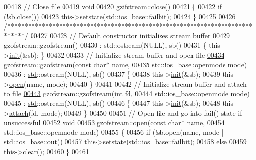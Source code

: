 \begin{DoxyCode}
{00418 \textcolor{comment}{// Close file}
00419 \textcolor{keywordtype}{void}
\hyperlink{classgzifstream_a073fadd9dc90195c47a6ae2d863c8ace}{00420} \hyperlink{classgzifstream_a073fadd9dc90195c47a6ae2d863c8ace}{gzifstream::close}()
00421 \{
00422   \textcolor{keywordflow}{if} (!sb.close())
00423     this->setstate(std::ios\_base::failbit);
00424 \}
00425 
00426 \textcolor{comment}{/*****************************************************************************/}
00427 
00428 \textcolor{comment}{// Default constructor initializes stream buffer}
00429 gzofstream::gzofstream()
00430 : std::ostream(NULL), sb()
00431 \{ this->\hyperlink{structinit}{init}(&sb); \}
00432 
00433 \textcolor{comment}{// Initialize stream buffer and open file}
\hyperlink{classgzofstream_a4334d31aab99f8c9c2277b672a55c78f}{00434} gzofstream::gzofstream(\textcolor{keyword}{const} \textcolor{keywordtype}{char}* name,
00435                        std::ios\_base::openmode mode)
00436 : \hyperlink{namespacestd}{std}::ostream(NULL), sb()
00437 \{
00438   this->\hyperlink{structinit}{init}(&sb);
00439   this->\hyperlink{classgzofstream_aee3eb31f07eda7f5ad1f60d59ea4b239}{open}(name, mode);
00440 \}
00441 
00442 \textcolor{comment}{// Initialize stream buffer and attach to file}
\hyperlink{classgzofstream_aa94d0c8414119a52f2a7f42aa0440941}{00443} gzofstream::gzofstream(\textcolor{keywordtype}{int} fd,
00444                        std::ios\_base::openmode mode)
00445 : \hyperlink{namespacestd}{std}::ostream(NULL), sb()
00446 \{
00447   this->\hyperlink{structinit}{init}(&sb);
00448   this->\hyperlink{classgzofstream_a95b76eaecd03b6cbf53d2f4b1c867439}{attach}(fd, mode);
00449 \}
00450 
00451 \textcolor{comment}{// Open file and go into fail() state if unsuccessful}
00452 \textcolor{keywordtype}{void}
\hyperlink{classgzofstream_aee3eb31f07eda7f5ad1f60d59ea4b239}{00453} \hyperlink{classgzofstream_aee3eb31f07eda7f5ad1f60d59ea4b239}{gzofstream::open}(\textcolor{keyword}{const} \textcolor{keywordtype}{char}* name,
00454                  std::ios\_base::openmode mode)
00455 \{
00456   \textcolor{keywordflow}{if} (!sb.open(name, mode | std::ios\_base::out))
00457     this->setstate(std::ios\_base::failbit);
00458   \textcolor{keywordflow}{else}
00459     this->clear();
00460 \}
00461 
}
\end{DoxyCode}
